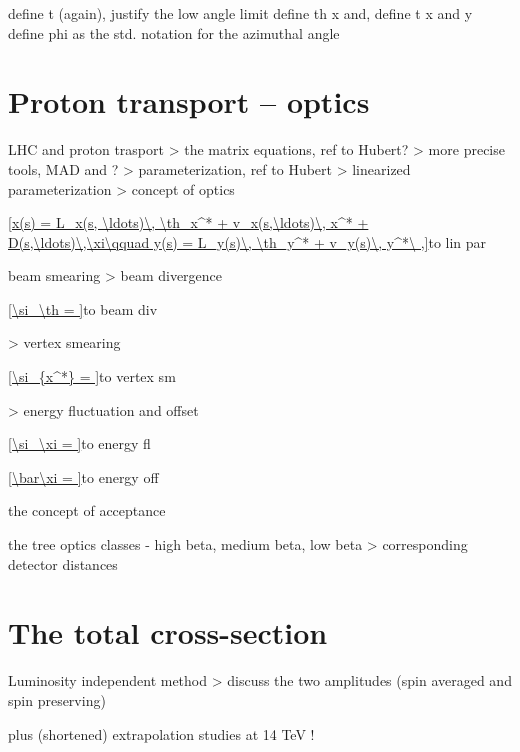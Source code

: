 \> define t (again), justify the low angle limit
\> define th x and, define t x and y
\> define phi as the std. notation for the azimuthal angle


\section[pr transport]{Proton transport -- optics}

\> LHC and proton trasport
\>> the matrix equations, ref to Hubert?
\>> more precise tools, MAD and ?
\>> parameterization, ref to Hubert
\>> linearized parameterization
\>> concept of optics

\eqref{x(s) = L_x(s, \ldots)\, \th_x^* + v_x(s,\ldots)\, x^* + D(s,\ldots)\,\xi\qquad y(s) = L_y(s)\, \th_y^* + v_y(s)\, y^*\ ,}{to lin par}

\> beam smearing
\>> beam divergence

\eqref{\si_\th = }{to beam div}

\>> vertex smearing

\eqref{\si_{x^*} = }{to vertex sm}

\>> energy fluctuation and offset

\eqref{\si_\xi = }{to energy fl}

\eqref{\bar\xi = }{to energy off}

\> the concept of acceptance


\> the tree optics classes - high beta, medium beta, low beta
\>> corresponding detector distances


\section{The total cross-section}

\> Luminosity independent method
\>> discuss the two amplitudes (spin averaged and spin preserving)

\> plus (shortened) extrapolation studies at 14 TeV !

\iffalse
islam_bfkl, 9E-01, 3E-01, 2E-02, 1E-03, 3E-04
 islam_cgc, 9E-01, 3E-01, 2E-02, 1E-03, 3E-04
      ppp2, 6E-02, 4E-03, 1E-04, 3E-06, 1E-06
      ppp3, 8E-01, 2E-01, 4E-03, 4E-03, 2E-03
       bsw, 5E-01, 2E-01, 1E-03, 2E-04, 2E-04
        bh, 2E+00, 3E-01, 7E-03, 3E-03, 2E-03
      mean, 8E-01, 2E-01, 8E-03, 1E-03, 8E-04
\fi

\bmfig
{}
\emfig

